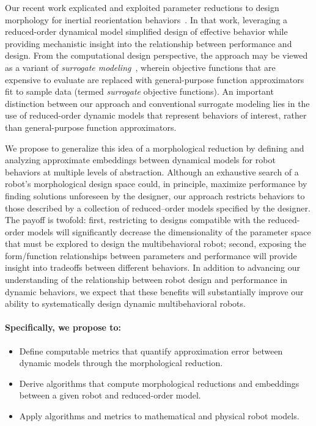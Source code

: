 \documentclass[11pt]{article}
\begin{document}
Our recent work explicated and exploited parameter reductions to design morphology for inertial reorientation behaviors~. 
In that work, leveraging a reduced-order dynamical model simplified design of effective behavior while providing mechanistic insight into the relationship between performance and design.
From the computational design perspective, the approach may be viewed as a variant of \emph{surrogate modeling}~, 
wherein objective functions that are expensive to evaluate are replaced with general-purpose function approximators fit to sample data (termed \emph{surrogate} objective functions).
An important distinction between our approach and conventional surrogate modeling lies in the use of reduced-order dynamic models
that represent behaviors of interest, 
rather than general-purpose function approximators.

We propose to generalize this idea of a morphological reduction by defining and analyzing approximate embeddings between dynamical models for robot behaviors at multiple levels of abstraction.
Although an exhaustive search of a robot's morphological design space could, in principle, maximize performance by finding solutions unforeseen by the designer,
our approach restricts behaviors to those described by a collection of reduced--order models specified by the designer. 
The payoff is twofold:
first, restricting to designs compatible with the reduced-order models will significantly decrease the dimensionality of the parameter space that must be explored to design the multibehavioral robot;
second, exposing the form/function relationships between parameters and performance will provide insight into tradeoffs between different behaviors.
In addition to advancing our understanding of the relationship between robot design and performance in dynamic behaviors,
we expect that these benefits will substantially improve our ability to systematically design dynamic multibehavioral robots.


\paragraph{Specifically, we propose to:}
\begin{itemize}[leftmargin=1.5cm]
    \item[\T{1.1}] Define computable metrics that quantify approximation error between dynamic models through the morphological reduction.
    \item[\T{1.2}] Derive algorithms that compute morphological reductions and embeddings between a given robot and reduced-order model.
    \item[\T{1.3}] Apply algorithms and metrics to mathematical and physical robot models.
\end{itemize}
\end{document}
